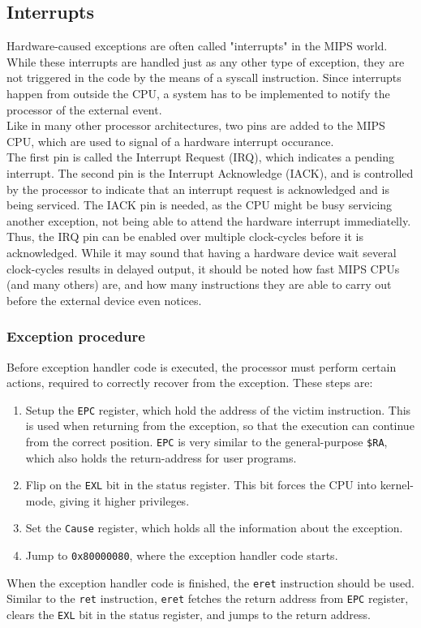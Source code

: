\subsection{Interrupts}
\label{sec:exceptions_interrupts}
Hardware-caused exceptions are often called "interrupts" in the MIPS world.
While these interrupts are handled just as any other type of exception, they
are not triggered in the code by the means of a syscall instruction. Since
interrupts happen from outside the CPU, a system has to be implemented to notify
the processor of the external event.\\
Like in many other processor architectures, two pins are added to the MIPS CPU,
which are used to signal of a hardware interrupt occurance\cite{cs_pitt:exceptions}.\\
The first pin is called the Interrupt Request (IRQ), which indicates a
pending interrupt. The second pin is the Interrupt Acknowledge (IACK), and is
controlled by the processor to indicate that an interrupt request is acknowledged
and is being serviced. The IACK pin is needed, as the CPU might be busy servicing
another exception, not being able to attend the hardware interrupt immediatelly.
Thus, the IRQ pin can be enabled over multiple clock-cycles before it is
acknowledged\cite{cs_pitt:exceptions}. While it may sound that having a hardware
device wait several clock-cycles results in delayed output, it should be noted
how fast MIPS CPUs (and many others) are, and how many instructions they are
able to carry out before the external device even notices.


\subsubsection{Exception procedure}
\label{sec:exception_procedure}
Before exception handler code is executed, the processor must perform certain
actions, required to correctly recover from the exception. These steps are\cite{see_mips_run}:
\begin{enumerate}
\item Setup the \texttt{EPC} register, which hold the address of the victim
instruction. This is used when returning from the exception, so that the
execution can continue from the correct position. \texttt{EPC} is very similar to the
general-purpose \texttt{\$RA}, which also holds the return-address for user
programs.
\item Flip on the \texttt{EXL} bit in the status register. This bit forces the
CPU into kernel-mode, giving it higher privileges.
\item Set the \texttt{Cause} register, which holds all the information about
the exception.
\item Jump to \texttt{0x80000080}, where the exception handler code starts.
\end{enumerate}
When the exception handler code is finished, the \texttt{eret} instruction should
be used. Similar to the \texttt{ret} instruction, \texttt{eret} fetches the return
address from \texttt{EPC} register, clears the \texttt{EXL} bit in the status
register, and jumps to the return address.


